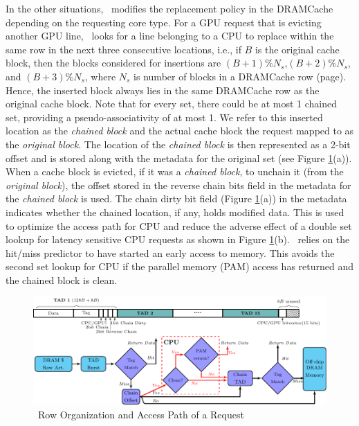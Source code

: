 In the other situations, \cachename\ modifies the replacement policy in the DRAMCache depending on the requesting core type. For a GPU request that is evicting another GPU line, \cachename\ looks for a line belonging to a CPU to replace within the same row in the next three consecutive locations,
i.e., if $B$ is the original cache block, then the blocks considered for insertions are $(B+1)\%N_s$,$(B+2)\%N_s$, and $(B+3)\%N_s$, where $N_s$ is number of blocks in a DRAMCache row (page). Hence, the inserted block always lies in the same DRAMCache row as the original cache block. Note that for every set, there could be at most 1 chained set, providing a pseudo-associativity of at most 1.  
We refer to this inserted location as the \textit{chained block} and the actual cache block the request mapped to as the \textit{original block}. The location of the \textit{chained block} is then represented as a 2-bit offset and is stored along with the metadata for the original set (see Figure \ref{fig:chain-access}(a)). When a cache block is evicted, if it was a \textit{chained block}, to unchain it (from the \textit{original block}), the offset stored in the reverse chain bits field in the metadata for the \textit{chained block} is used.  
The chain dirty bit field (Figure \ref{fig:chain-access}(a)) in the metadata indicates whether the chained location, if any, holds modified data. This is used to optimize the access path for CPU and reduce the adverse effect of a double set lookup for latency sensitive CPU requests as shown in Figure \ref{fig:chain-access}(b). \chaining\ relies on the hit/miss predictor to have started an early access to memory. This avoids the second set lookup for CPU if the parallel memory (PAM) access has returned and the chained block is clean. 


\begin{figure}[htb]
	\centering
	\includegraphics[scale=0.96]{figures/chaining}
	\caption{\cachename\ Row Organization and Access Path of a Request}	
	\label{fig:chain-access}
\end{figure}

